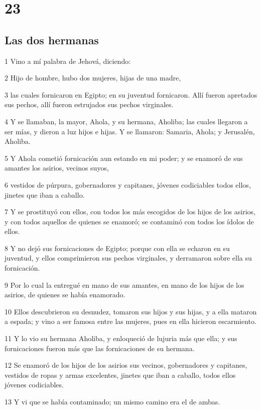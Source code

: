\chapter{23}

\section*{Las dos hermanas}

\par 1 Vino a mí palabra de Jehová, diciendo:
\par 2 Hijo de hombre, hubo dos mujeres, hijas de una madre,
\par 3 las cuales fornicaron en Egipto; en su juventud fornicaron. Allí fueron apretados sus pechos, allí fueron estrujados sus pechos virginales.
\par 4 Y se llamaban, la mayor, Ahola, y su hermana, Aholiba; las cuales llegaron a ser mías, y dieron a luz hijos e hijas. Y se llamaron: Samaria, Ahola; y Jerusalén, Aholiba.
\par 5 Y Ahola cometió fornicación aun estando en mi poder; y se enamoró de sus amantes los asirios, vecinos suyos,
\par 6 vestidos de púrpura, gobernadores y capitanes, jóvenes codiciables todos ellos, jinetes que iban a caballo.
\par 7 Y se prostituyó con ellos, con todos los más escogidos de los hijos de los asirios, y con todos aquellos de quienes se enamoró; se contaminó con todos los ídolos de ellos. 
\par 8 Y no dejó sus fornicaciones de Egipto; porque con ella se echaron en su juventud, y ellos comprimieron sus pechos virginales, y derramaron sobre ella su fornicación.
\par 9 Por lo cual la entregué en mano de sus amantes, en mano de los hijos de los asirios, de quienes se había enamorado.
\par 10 Ellos descubrieron su desnudez, tomaron sus hijos y sus hijas, y a ella mataron a espada; y vino a ser famosa entre las mujeres, pues en ella hicieron escarmiento.
\par 11 Y lo vio su hermana Aholiba, y enloqueció de lujuria más que ella; y sus fornicaciones fueron más que las fornicaciones de su hermana.
\par 12 Se enamoró de los hijos de los asirios sus vecinos, gobernadores y capitanes, vestidos de ropas y armas excelentes, jinetes que iban a caballo, todos ellos jóvenes codiciables.
\par 13 Y vi que se había contaminado; un mismo camino era el de ambas.
